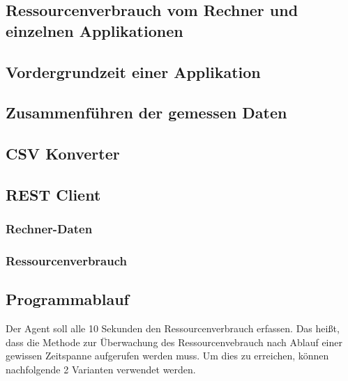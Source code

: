 \documentclass{report}
\begin{document}
\subsection{Ressourcenverbrauch vom Rechner und einzelnen Applikationen}
\subsection{Vordergrundzeit einer Applikation}
\subsection{Zusammenführen der gemessen Daten}
\subsection{CSV Konverter}
\subsection{REST Client}
\subsubsection{Rechner-Daten}
\subsubsection{Ressourcenverbrauch}
\subsection{Programmablauf}
Der Agent soll alle 10 Sekunden den Ressourcenverbrauch erfassen. Das heißt, dass die Methode zur Überwachung des Ressourcenvebrauch nach Ablauf einer gewissen Zeitspanne aufgerufen werden muss. Um dies zu erreichen, können nachfolgende 2 Varianten verwendet werden.
\end{document}
